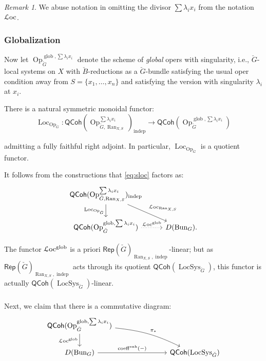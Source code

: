 \documentclass[reqno,11pt]{amsart}
\numberwithin{equation}{subsection}
\theoremstyle{remark}
\newtheorem{rem}[thm]{Remark}
\newcommand{\Loc}{\on{Loc}}
\newcommand{\sL}{{\EuScript L}}
\newcommand{\on}{\operatorname}
\newcommand{\Rep}{\mathsf{Rep}}
\newcommand{\Bun}{\on{Bun}}
\newcommand{\LocSys}{\on{LocSys}}
\newcommand{\Op}{\on{Op}}
\newcommand{\QCoh}{\mathsf{QCoh}}
\newcommand{\coeff}{\on{coeff}}
\newcommand{\enh}{\on{enh}}
\newcommand{\Ran}{\on{Ran}}
\begin{document}
\begin{rem}

We abuse notation in omitting the divisor $\sum \lambda_i x_i$ from the notation
$\sL\text{oc}$.

\end{rem}

\subsubsection{Globalization}

Now let $\Op_{\check{G}}^{\on{glob},\sum \lambda_i x_i}$ denote the
scheme of \emph{global} opers with singularity, i.e., $\check{G}$-local systems
on $X$ with $\check{B}$-reductions as a $\check{G}$-bundle satisfying the usual oper
condition away from $S = \{x_1,\ldots,x_n\}$ and satisfying the version with 
singularity $\lambda_i$ at $x_i$.

There is a natural symmetric monoidal functor:
%
\[
\Loc_{\Op_{\check{G}}}:
\QCoh(\Op_{\check{G},\Ran_{X,S}}^{\sum \lambda_i x_i})_{\on{indep}} \to 
\QCoh(\Op_{\check{G}}^{\on{glob},\sum \lambda_i x_i})
\]

\noindent admitting a fully faithful right adjoint. In particular,
$\Loc_{\Op_{\check{G}}}$ is a quotient functor.

It follows from the constructions that \eqref{eq:sloc} factors as:
%
\[
\begin{tikzcd}
\QCoh(\Op_{\check{G},\Ran_{X,S}}^{\sum \lambda_i x_i})_{\on{indep}}
\arrow[dr,"\sL\text{oc}_{\Ran_{X,S}}"] 
\arrow[d,swap,"\Loc_{\Op_{\check{G}}}"]
& \\
\QCoh(\Op_{\check{G}}^{\on{glob},\sum \lambda_i x_i})
\arrow[r,dotted,"\sL\text{oc}^{\on{glob}}"]
&
D(\Bun_G).
\end{tikzcd}
\]

The functor $\sL\text{oc}^{\on{glob}}$ is a priori 
$\Rep(\check{G})_{\Ran_{X,S},\on{indep}}$-linear; but as 
$\Rep(\check{G})_{\Ran_{X,S},\on{indep}}$ acts through its quotient 
$\QCoh(\LocSys_{\check{G}})$, this functor is actually 
$\QCoh(\LocSys_{\check{G}})$-linear.

\subsubsection{}

Next, we claim that there is a commutative diagram:
%
\begin{equation}\label{eq:coeff-opers}
\begin{tikzcd}
\QCoh(\Op_{\check{G}}^{\on{glob},\sum \lambda_i x_i})
\arrow[d,swap,"\sL\text{oc}^{\on{glob}}"]
\arrow[drrr,bend left = 10,"\pi_*"]
&
\\
D(\Bun_G)
\arrow[rrr,"{\coeff^{\enh}(-)}"]
&&&
\QCoh(\LocSys_{\check{G}})
\end{tikzcd}
\end{equation}
\end{document}
